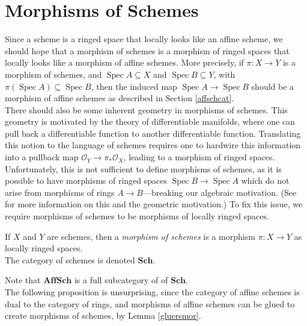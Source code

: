 \documentclass[11pt,openany]{book} %
\newcommand{\spc}{\operatorname{Spec}}
\begin{document}

\section{Morphisms of Schemes} \label{schememor}
Since a scheme is a ringed space that locally looks like an affine scheme, we should hope that a morphism of schemes is a morphism of ringed spaces that locally looks like a morphism of affine schemes. More precisely, if $\pi : X \to Y$ is a morphism of schemes, and $\spc A \subseteq X$ and $\spc B \subseteq Y$, with $\pi(\spc A) \subseteq \spc B$, then the induced map $\spc A \to \spc B$ should be a morphism of affine schemes as described in Section \ref{affschcat}.\\


There should also be some inherent geometry in morphisms of schemes. This geometry is motivated by the theory of differentiable manifolds, where one can pull back a differentiable function to another differentiable function. Translating this notion to the language of schemes requires one to hardwire this information into a pullback map $\mathcal{O}_Y \to \pi_*\mathcal{O}_X$, leading to a morphism of ringed spaces. Unfortunately, this is not sufficient to define morphisms of schemes, as it is possible to have morphisms of ringed spaces $\spc B \to \spc A$ which do not arise from morphisms of rings $A \to B$---breaking our algebraic motivation. (See \cite{vakil} for more information on this and the geometric motivation.) To fix this issue, we require morphisms of schemes to be morphisms of locally ringed spaces.\\

\begin{definition}
If $X$ and $Y$ are schemes, then a \emph{morphism of schemes} is a morphism $\pi : X \to Y$ as locally ringed spaces.\\

The category of schemes is denoted $\mathbf{Sch}$.
\end{definition}

Note that $\mathbf{AffSch}$ is a full subcategory of of $\mathbf{Sch}$.\\

The following proposition is unsurprising, since the category of affine schemes is dual to the category of rings, and morphisms of affine schemes can be glued to create morphisms of schemes, by Lemma \ref{gluersmor}.\\
\end{document}
